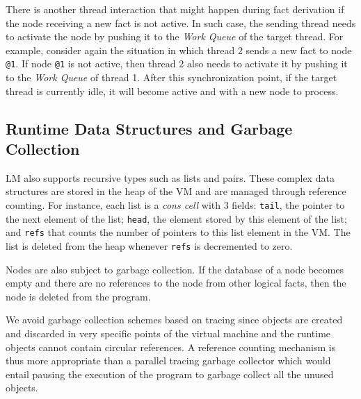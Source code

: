 There is another thread interaction that might happen during fact
derivation if the node receiving a new fact is not active. In such
case, the sending thread needs to activate the node by pushing it to
the \emph{Work Queue} of the target thread. For example, consider
again the situation in which thread 2 sends a new fact to
node \texttt{@1}. If node \texttt{@1} is not active, then thread 2
also needs to activate it by pushing it to the \emph{Work Queue} of
thread 1. After this synchronization point, if the target thread is
currently idle, it will become active and with a new node to process.

\subsection{Runtime Data Structures and Garbage Collection}

LM also supports recursive types such as lists and pairs. These complex data
structures are stored in the heap of the VM and are managed through reference
counting. For instance, each list is a \emph{cons cell} with 3 fields:
\texttt{tail}, the pointer to the next element of the list; \texttt{head}, the
element stored by this element of the list; and \texttt{refs} that counts the
number of pointers to this list element in the VM. The list is deleted from the
heap whenever \texttt{refs} is decremented to zero.

Nodes are also subject to garbage collection. If the database of a node becomes
empty and there are no references to the node from other logical facts, then
the node is deleted from the program.

We avoid garbage collection schemes based on tracing since objects are created
and discarded in very specific points of the virtual machine and the runtime
objects cannot contain circular references. A reference counting mechanism is
thus more appropriate than a parallel tracing garbage collector which would
entail pausing the execution of the program to garbage collect all the unused
objects.

